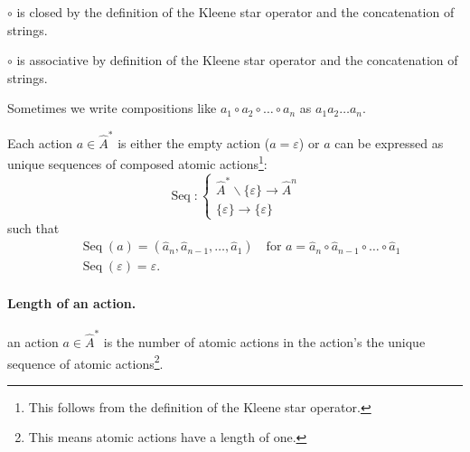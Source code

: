 \begin{corollaryE}
    $\circ$ is closed by the definition of the Kleene star operator and the concatenation of strings.
\end{corollaryE}

\begin{corollaryE}\label{col:circ_associative}
    $\circ$ is associative by definition of the Kleene star operator and the concatenation of strings.
\end{corollaryE}

\begin{notation}
	Sometimes we write compositions like $a_1 \circ a_2 \circ \dots \circ a_n$ as $a_1 a_2 \dots a_n$.
\end{notation}


Each action $a \in \hat{A}^{*}$ is either the empty action ($a = \varepsilon$) or $a$ can be expressed as unique sequences of composed atomic actions\footnote{
This follows from the definition of the Kleene star operator.
}:
\begin{equation}
    \operatorname{Seq} : \left\{ 
    \begin{array}{l}
        \hat{A}^{*} \backslash \{\varepsilon\} \to \hat{A}^{n} \\
        \{\varepsilon\} \to \{\varepsilon\}
    \end{array} \right.
\end{equation}
such that
\begin{align}
    & \operatorname{Seq}(a) = (\hat{a}_{n}, \hat{a}_{n-1}, \dots, \hat{a}_{1}) \quad \text{for $a = \hat{a}_{n} \circ \hat{a}_{n-1} \circ \dots \circ \hat{a}_{1}$} \\
    & \operatorname{Seq}(\varepsilon) = \varepsilon.
\end{align}


\paragraph{Length of an action.}
 an action $a \in \hat{A}^{*}$ is the number of atomic actions in the action's the unique sequence of atomic actions\footnote{
	This means atomic actions have a length of one.
}.


